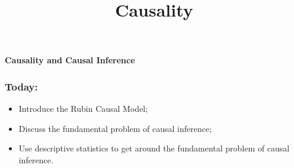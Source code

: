 \documentclass[aspectratio=169]{beamer}
\title{Causality}
\date{}
\theoremstyle{principle}
\begin{document}


{
  \begin{frame}[plain]
  
\begin{mdframed}[tikzsetting={draw=white,fill=white,fill opacity=0.6,draw opacity=0.4,
               line width=0pt},backgroundcolor=none,leftmargin=20,
               rightmargin=20,innertopmargin=4pt]
\begin{center}
\Huge \textbf{Causality and Causal Inference}
\end{center}
\end{mdframed}

  \end{frame}
}

\begin{frame}
\frametitle{Today:}
\begin{itemize}
\item Introduce the Rubin Causal Model;
\bigskip
\bigskip

\item Discuss the fundamental problem of causal inference;
\bigskip
\bigskip

\item Use descriptive statistics to get around the fundamental problem of causal inference.
\bigskip
\bigskip

\end{itemize}
\end{frame}
\end{document}
